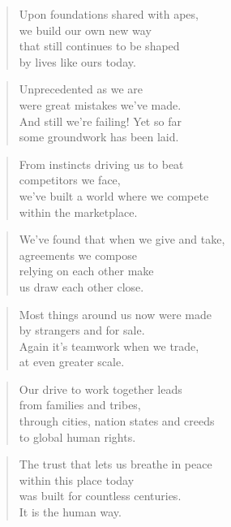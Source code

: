 \documentclass[14pt,a4paper]{article}
\begin{document}
\begin{verse}
Upon foundations shared with apes,\\
we build our own new way\\
that still continues to be shaped\\
by lives like ours today.
\end{verse}

\begin{verse}
Unprecedented as we are\\
were great mistakes we’ve made.\\
And still we’re failing! Yet so far\\
some groundwork has been laid.
\end{verse}

\begin{verse}
From instincts driving us to beat\\
competitors we face,\\
we’ve built a world where we compete\\
within the marketplace.
\end{verse}

\begin{verse}
We’ve found that when we give and take,\\
agreements we compose\\
relying on each other make\\
us draw each other close.
\end{verse}

\begin{verse}
Most things around us now were made\\
by strangers and for sale.\\
Again it’s teamwork when we trade,\\
at even greater scale.
\end{verse}

\begin{verse}
Our drive to work together leads\\
from families and tribes,\\
through cities, nation states and creeds\\
to global human rights.
\end{verse}

\begin{verse}
The trust that lets us breathe in peace\\
within this place today\\
was built for countless centuries.\\
It is the human way.
\end{verse}
\end{document}
